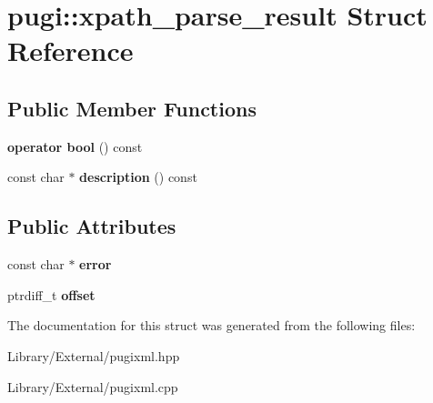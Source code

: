 \hypertarget{structpugi_1_1xpath__parse__result}{}\section{pugi\+:\+:xpath\+\_\+parse\+\_\+result Struct Reference}
\label{structpugi_1_1xpath__parse__result}
\subsection*{Public Member Functions}
\begin{DoxyCompactItemize}
\item 
\hypertarget{structpugi_1_1xpath__parse__result_a79b82e65183e2fe7e4c866afb02b07c0}{}{\bfseries operator bool} () const \label{structpugi_1_1xpath__parse__result_a79b82e65183e2fe7e4c866afb02b07c0}

\item 
\hypertarget{structpugi_1_1xpath__parse__result_a3de342b3c2c13db7ba9dafba73c06228}{}const char $\ast$ {\bfseries description} () const \label{structpugi_1_1xpath__parse__result_a3de342b3c2c13db7ba9dafba73c06228}

\end{DoxyCompactItemize}
\subsection*{Public Attributes}
\begin{DoxyCompactItemize}
\item 
\hypertarget{structpugi_1_1xpath__parse__result_ab2c625be89b995afac829012bc749fe4}{}const char $\ast$ {\bfseries error}\label{structpugi_1_1xpath__parse__result_ab2c625be89b995afac829012bc749fe4}

\item 
\hypertarget{structpugi_1_1xpath__parse__result_add47d886c654b4d8a836573b2c2a7acb}{}ptrdiff\+\_\+t {\bfseries offset}\label{structpugi_1_1xpath__parse__result_add47d886c654b4d8a836573b2c2a7acb}

\end{DoxyCompactItemize}


The documentation for this struct was generated from the following files\+:\begin{DoxyCompactItemize}
\item 
Library/\+External/pugixml.\+hpp\item 
Library/\+External/pugixml.\+cpp\end{DoxyCompactItemize}
